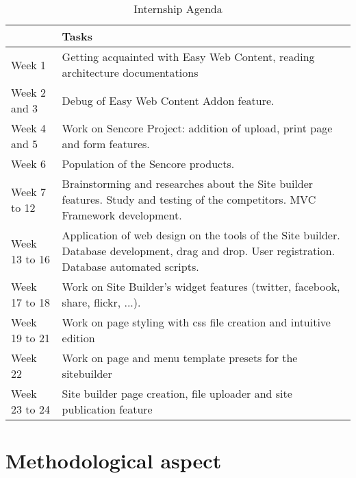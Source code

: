 \begin{table}[!ht]
	\caption{\label{tableau:agenda}Internship Agenda}
	\begin{tabular}{ | l | p{12cm} | }
		\hline
		 & Tasks\\
		\hline
		Week 1	      &		Getting acquainted with Easy Web Content, reading architecture documentations\\	\hline
		Week 2 and 3  &		Debug of Easy Web Content Addon feature.\\	\hline
		Week 4 and 5  &		Work on Sencore Project: addition of upload, print page and form features.\\	\hline
		Week 6        &		Population of the Sencore products.\\	\hline
		Week 7  to 12 &		Brainstorming and researches about the Site builder features. Study and testing of the competitors. MVC Framework development.\\	\hline
		Week 13 to 16 &		Application of web design on the tools of the Site builder. Database development, drag and drop. User registration. Database automated scripts.	\\	\hline
		Week 17	to 18 &		Work on Site Builder's widget features (twitter, facebook, share, flickr, ...).\\	\hline
		Week 19	to 21 &		Work on page styling with css file creation and intuitive edition\\	\hline
		Week 22		  &		Work on page and menu template presets for the sitebuilder\\	\hline
		Week 23	to 24 &		Site builder page creation, file uploader and site publication feature\\	\hline
	\end{tabular}
\end{table}

\section{Methodological aspect}

